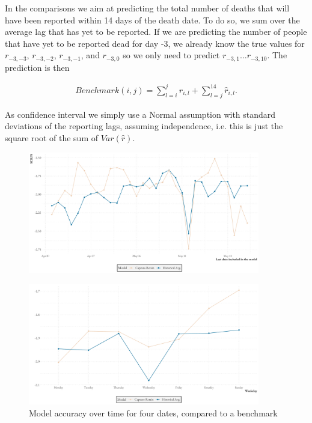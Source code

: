 In the comparisons we aim at predicting the total number of deaths that will have been reported within 14 days of the death date. To do so, we sum over the average lag that has yet to be reported. If we are predicting the number of people that have yet to be reported dead for day -3, we already know the true values for $r_{-3,-3}$, $r_{-3,-2}$, $r_{-3,-1}$, and $r_{-3,0}$ so we only need to predict $r_{-3,1}\ldots r_{-3,10}$. The prediction is then

\begin{align}
    Benchmark(i, j) = \sum_{l=i}^{j} r_{i,l}+ \sum_{l = j}^{14} \hat{r}_{i, l}.
\end{align}

As confidence interval we simply use a Normal assumption with standard deviations of the reporting lags, assuming independence, i.e. this is just the square root of the sum of $Var(\hat{r})$.

\begin{figure}
    \centering
    \includegraphics[width=0.9\textwidth]{../plots/SCRPS_over_states}
    \caption{}
    \label{fig:SCRPS_states}
\end{figure}

\begin{figure}
    \centering
    \includegraphics[width=0.9\textwidth]{../plots/SCRPS_over_weekdays}
    \caption{Model accuracy over time for four dates, compared to a benchmark}
    \label{fig:SCRPS_weekdays}
\end{figure}



% 
% 
% 



